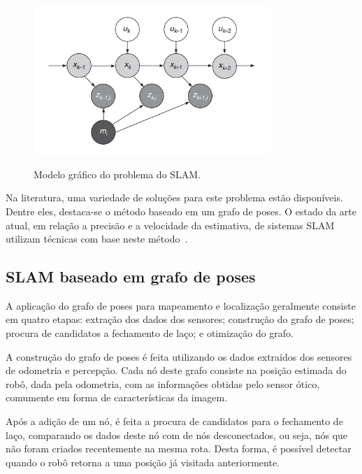 \documentclass[repeatfields,xlists,xpacks,oneside,yearsonly]{ufrgscca}
\begin{document}
\begin{figure}[h]
    {
        \centering
        \caption{Modelo gráfico do problema do SLAM.}
        \label{fig:slam_algo}
        \includegraphics[width=0.8\textwidth]{graphic_slam_representation.png}\\
    }
    {}
\end{figure}

Na literatura, uma variedade de soluções para este problema estão
disponíveis. Dentre eles, destaca-se o método baseado em um grafo de
poses. O estado da arte atual, em relação a precisão e a velocidade
da estimativa, de sistemas SLAM utilizam técnicas com base neste
método~\cite{graph_slam_tutorial}.


\subsection{SLAM baseado em grafo de poses}

A aplicação do grafo de poses para mapeamento e localização
geralmente consiste em quatro etapas: extração dos dados dos
sensores; construção do grafo de poses; procura de candidatos a
fechamento de laço; e otimização do grafo.

A construção do grafo de poses é feita utilizando os dados extraídos
dos sensores de odometria e percepção. Cada nó deste grafo consiste
na posição estimada do robô, dada pela odometria, com as informações
obtidas pelo sensor ótico, comumente em forma de características da
imagem.

Após a adição de um nó, é feita a procura de candidatos para o
fechamento de laço, comparando os dados deste nó com de nós
desconectados, ou seja, nós que não foram criados recentemente na
mesma rota. Desta forma, é possível detectar quando o robô retorna a
uma posição já visitada anteriormente.
\end{document}
